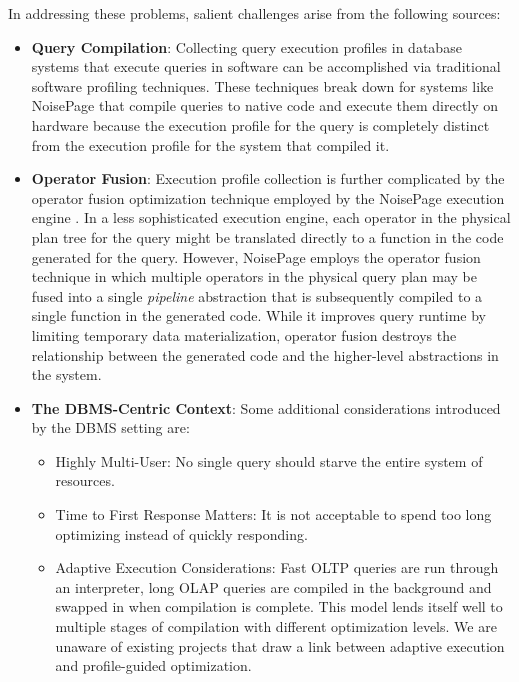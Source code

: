 \documentclass{vldb}
\begin{document}
In addressing these problems, salient challenges arise from the following sources:

\begin{itemize}
    \item \textbf{Query Compilation}: Collecting query execution profiles in database systems that execute queries in software can be accomplished via traditional software profiling techniques. These techniques break down for systems like NoisePage that compile queries to native code and execute them directly on hardware because the execution profile for the query is completely distinct from the execution profile for the system that compiled it.
    \item \textbf{Operator Fusion}: Execution profile collection is further complicated by the operator fusion optimization technique employed by the NoisePage execution engine \cite{menon18}. In a less sophisticated execution engine, each operator in the physical plan tree for the query might be translated directly to a function in the code generated for the query. However, NoisePage employs the operator fusion technique in which multiple operators in the physical query plan may be fused into a single \textit{pipeline} abstraction that is subsequently compiled to a single function in the generated code. While it improves query runtime by limiting temporary data materialization, operator fusion destroys the relationship between the generated code and the higher-level abstractions in the system.
    \item \textbf{The DBMS-Centric Context}: Some additional considerations introduced by the DBMS setting are:
    \begin{itemize}
        \item Highly Multi-User: No single query should starve the entire system of resources.
        \item Time to First Response Matters: It is not acceptable to spend too long optimizing instead of quickly responding.
        \item Adaptive Execution Considerations: Fast OLTP queries are run through an interpreter, long OLAP queries are compiled in the background and swapped in when compilation is complete. This model lends itself well to multiple stages of compilation with different optimization levels. We are unaware of existing projects that draw a link between adaptive execution and profile-guided optimization.
    \end{itemize}
\end{itemize}
\end{document}
